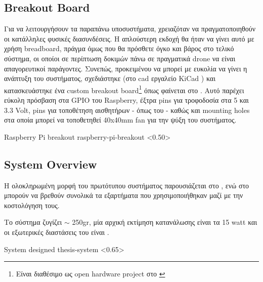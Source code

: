 \subsection{Breakout Board}
Για να λειτουργήσουν τα παραπάνω υποσυστήματα, χρειαζόταν να πραγματοποιηθούν οι κατάλληλες φυσικές διασυνδέσεις. Η απλούστερη εκδοχή θα ήταν να γίνει αυτό με χρήση breadboard, πράγμα όμως που θα πρόσθετε όγκο και βάρος στο τελικό σύστημα, οι οποίοι σε περίπτωση δοκιμών πάνω σε πραγματικά drone να είναι απαγορευτικοί παράγοντες. Συνεπώς, προκειμένου να μπορεί με ευκολία να γίνει η ανάπτυξη του συστήματος, σχεδιάστηκε (στο cad εργαλείο KiCad \cite{KiCad}) και κατασκευάστηκε ένα custom breakout board\footnote{Είναι διαθέσιμο ως open hardware project στο \cite{raspberry-pi-fan-breadkout}} όπως φαίνεται στο . Αυτό παρέχει εύκολη πρόσβαση στα GPIO του Raspberry, έξτρα pins για τροφοδοσία στα 5 και 3.3 Volt, pins για τοποθέτηση αισθητήρων - όπως του  - καθώς και mounting holes στα οποία μπορεί να τοποθετηθεί 40x40mm fan για την ψύξη του συστήματος. 

%
{Raspberry Pi breakout}%
{raspberry-pi-breakout}%
<0.50>


\subsection{System Overview}
Η ολοκληρωμένη μορφή του πρωτότυπου συστήματος παρουσιάζεται στο , ενώ στο  μπορούν να βρεθούν συνολικά τα εξαρτήματα που χρησιμοποιήθηκαν μαζί με την κοστολόγηση τους. 

Το σύστημα ζυγίζει $\sim$ 250gr, μία αρχική εκτίμηση κατανάλωσης είναι τα 15 watt και οι εξωτερικές διαστάσεις του είναι .

{System designed}%
{thesis-system}%
<0.65>

\begin{table}[H]
    \caption[]{Bill of Materials}
    \label{tab:thesis-system-bom}
    \centering
  \end{table}


